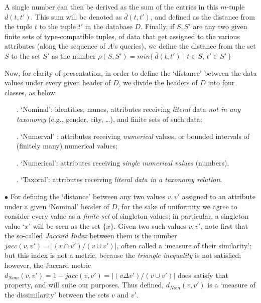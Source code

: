\documentclass[pdflatex]{article}
\def \ovr {\overline}
\begin{document}
 A single number can then be derived  as the  sum of the  entries in  this
 $m$-tuple $d(t, t')$. This sum will be denoted as $\ovr{d}(t, t')$, and defined
 as the distance from the tuple $t$ to the tuple $t'$ in the database $D$. 
 Finally, if $S, S'$ are any two given finite sets of type-compatible tuples, of data
 that  get assigned to the various attributes (along the sequence of $A$'s queries),
 we define  the distance from the set $S$ to the set $S'$ as the number 
  $\rho(S, S') = min \{\, \ovr{d}(t, t') \mid t \in S, \, t' \in S' \, \}$

 \vspace*{1mm}
 Now, for clarity of presentation, in order to define the `distance' between the  data
 values under  every given header of $D$, we  divide the  headers of $D$ into  four
 classes, as below:  
   
 \vspace*{-1em}
 \begin{itemize}
 \item[.]  `Nominal':  identities, names, attributes  receiving {\em literal} data 
  {\em not  in any taxonomy} (e.g., gender, city, \dots), and finite sets  of  such data;
   \vspace*{-1mm}
 \item[.]  `Numerval' : attributes receiving {\em numerical} values, or bounded
   intervals of  (finitely many) numerical values;
  \item[.]   `Numerical': attributes receiving {\em single numerical values}  (numbers).  
   \vspace*{-1mm}
 \item[.] `Taxoral': attributes receiving {\em literal data in a taxonomy relation}. 
\end{itemize}

 \vspace*{-1mm}
 $\bullet$  For defining the `distance'  between any two values $v, v'$ assigned to an
 attribute under a given `Nominal'   header of $D$,  for the  sake of uniformity  we
 agree to  consider every value as a  {\em  finite set}  of singleton values; in particular,
 a  singleton value `$x$' will be seen as the set $\{x\}$. Given two such values
 $v, v'$, note  first that the so-called {\em Jaccard Index} between them is the number
 $jacc(v, v') = |(v \cap v') / (v \cup v') |$, often called  a `measure of their similarity';
 but this index  is not a metric, because  the {\em triangle inequality} is not satisfied;
 however, the  Jaccard metric $d_{Nom}(v, v') = 1 - jacc(v, v') =  |(v \Delta v') / (v \cup v')|$
 does satisfy that property, and will suite our purposes. Thus defined, $d_{Nom}(v, v')$
 is a `measure of the dissimilarity' between the sets $v$ and $v'$. 
   
\end{document}
